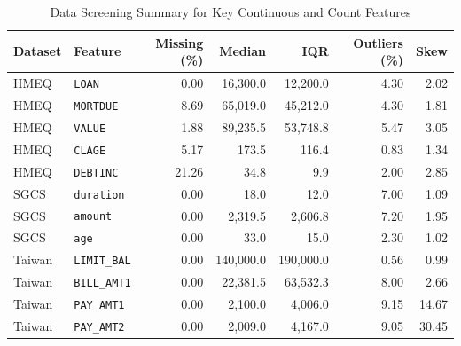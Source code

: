 \documentclass[conference]{IEEEtran}
\begin{document}
\begin{table}[!t]
\centering
\caption{Data Screening Summary for Key Continuous and Count Features}
\label{tab:screening}
\scriptsize
\renewcommand{\arraystretch}{0.86}
\setlength{\tabcolsep}{3.0pt}
\begin{tabular}{@{}llrrrrr@{}}
\toprule
\textbf{Dataset} & \textbf{Feature} & \textbf{Missing (\%)} & \textbf{Median} & \textbf{IQR} & \textbf{Outliers (\%)} & \textbf{Skew} \\
\midrule
HMEQ & \texttt{LOAN} & 0.00 & 16,300.0 & 12,200.0 & 4.30 & 2.02 \\
HMEQ & \texttt{MORTDUE} & 8.69 & 65,019.0 & 45,212.0 & 4.30 & 1.81 \\
HMEQ & \texttt{VALUE} & 1.88 & 89,235.5 & 53,748.8 & 5.47 & 3.05 \\
HMEQ & \texttt{CLAGE} & 5.17 & 173.5 & 116.4 & 0.83 & 1.34 \\
HMEQ & \texttt{DEBTINC} & 21.26 & 34.8 & 9.9 & 2.00 & 2.85 \\
\midrule
SGCS & \texttt{duration} & 0.00 & 18.0 & 12.0 & 7.00 & 1.09 \\
SGCS & \texttt{amount} & 0.00 & 2,319.5 & 2,606.8 & 7.20 & 1.95 \\
SGCS & \texttt{age} & 0.00 & 33.0 & 15.0 & 2.30 & 1.02 \\
\midrule
Taiwan & \texttt{LIMIT\_BAL} & 0.00 & 140,000.0 & 190,000.0 & 0.56 & 0.99 \\
Taiwan & \texttt{BILL\_AMT1} & 0.00 & 22,381.5 & 63,532.3 & 8.00 & 2.66 \\
Taiwan & \texttt{PAY\_AMT1} & 0.00 & 2,100.0 & 4,006.0 & 9.15 & 14.67 \\
Taiwan & \texttt{PAY\_AMT2} & 0.00 & 2,009.0 & 4,167.0 & 9.05 & 30.45 \\
\bottomrule
\end{tabular}
\end{table}
\end{document}
